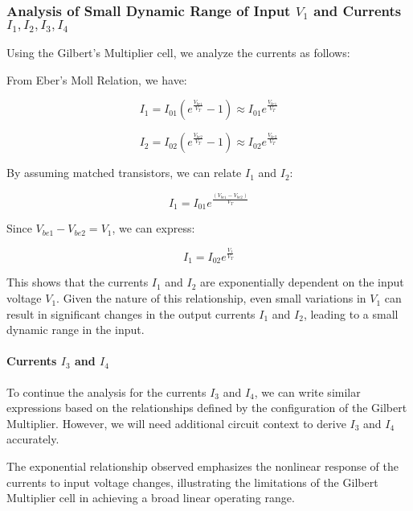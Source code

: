\documentclass[a4paper,9pt,twoside,openany,twocolumn]{memoir}
\begin{document}
\subsubsection{Analysis of Small Dynamic Range of Input \( V_1 \) and Currents \( I_1, I_2, I_3, I_4 \)}

Using the Gilbert’s Multiplier cell, we analyze the currents as follows:

From Eber's Moll Relation, we have:

\begin{equation}
I_1 = I_{01} \left( e^{\frac{V_{be1}}{V_T}} - 1 \right) \approx I_{01} e^{\frac{V_{be1}}{V_T}} \tag{1}
\end{equation}

\begin{equation}
I_2 = I_{02} \left( e^{\frac{V_{be2}}{V_T}} - 1 \right) \approx I_{02} e^{\frac{V_{be2}}{V_T}} \tag{2}
\end{equation}

By assuming matched transistors, we can relate \( I_1 \) and \( I_2 \):

\begin{equation}
I_1 = I_{01} e^{\frac{(V_{be1} - V_{be2})}{V_T}} \tag{3}
\end{equation}

Since \( V_{be1} - V_{be2} = V_1 \), we can express:

\begin{equation}
I_1 = I_{02} e^{\frac{V_1}{V_T}} \tag{4}
\end{equation}

This shows that the currents \( I_1 \) and \( I_2 \) are exponentially dependent on the input voltage \( V_1 \). Given the nature of this relationship, even small variations in \( V_1 \) can result in significant changes in the output currents \( I_1 \) and \( I_2 \), leading to a small dynamic range in the input.

\paragraph{Currents \( I_3 \) and \( I_4 \)}
To continue the analysis for the currents \( I_3 \) and \( I_4 \), we can write similar expressions based on the relationships defined by the configuration of the Gilbert Multiplier. However, we will need additional circuit context to derive \( I_3 \) and \( I_4 \) accurately.

The exponential relationship observed emphasizes the nonlinear response of the currents to input voltage changes, illustrating the limitations of the Gilbert Multiplier cell in achieving a broad linear operating range.
\end{document}
